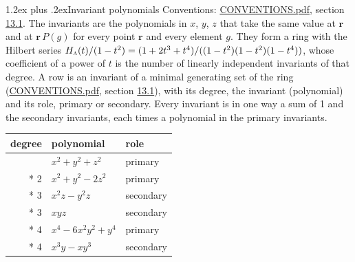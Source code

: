 \documentclass[10pt,a4paper]{article}
\makeatletter
\renewcommand\section{\@startsection{section}{1}{\z@}{-3ex plus -1ex minus -.2ex}%
  {1.2ex plus .2ex}{\normalfont\large\sffamily\bfseries\color{parttitle}}}
\numberwithin{equation}{section}
\newcommand{\irr}[1]{\text{\normalfont\scshape #1}}
\newcommand{\pointr}{\mathbf{r}}
\makeatother
\begin{document}
\section{Invariant polynomials}\label{s:invariant_polynomials}
Conventions: \href{../../CONVENTIONS.pdf}{CONVENTIONS.pdf}, section \href{../../CONVENTIONS.pdf\#conv.13.1}{13.1}.
The invariants are the polynomials in $x$, $y$, $z$ that take the same value at $\pointr$ and at $\pointr\,P(g)$ for every point $\pointr$ and every element $g$. They form a ring with the Hilbert series $H_{\irr{a}}(t)/(1-t^{2}) = (1 + 2t^{3} + t^{4})/((1-t^{2})(1-t^{2})(1-t^{4}))$, whose coefficient of a power of $t$ is the number of linearly independent invariants of that degree. \label{n:head.degree}\label{n:head.role}A row is an invariant of a minimal generating set of the ring (\href{../../CONVENTIONS.pdf}{CONVENTIONS.pdf}, section \href{../../CONVENTIONS.pdf\#conv.13.1}{13.1}), with its degree, the invariant (polynomial) and its role, primary or secondary. Every invariant is in one way a sum of 1 and the secondary invariants, each times a polynomial in the primary invariants.
{\small\begin{longtable}{@{}rll@{}}\toprule
degree & polynomial & role\\\midrule\endhead
\bottomrule\endfoot\endlastfoot
2 & $x^{2} + y^{2} + z^{2}$ & primary\\*
2 & $x^{2} + y^{2} - 2z^{2}$ & primary\\*
3 & $x^{2}z - y^{2}z$ & secondary\\*
3 & $xyz$ & secondary\\*
4 & $x^{4} - 6x^{2}y^{2} + y^{4}$ & primary\\*
4 & $x^{3}y - xy^{3}$ & secondary\\
\bottomrule\end{longtable}}
\end{document}
